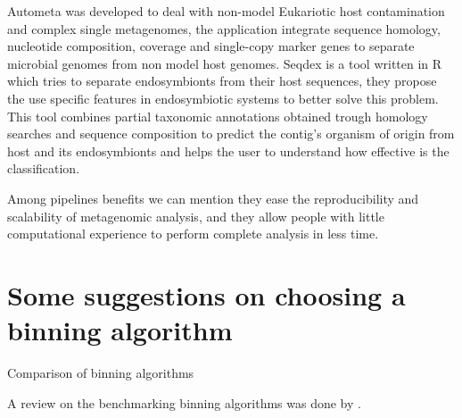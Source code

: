 \documentclass{article}
\begin{document}
Autometa was developed to deal with non-model Eukariotic host contamination and complex single metagenomes, the application integrate sequence homology, nucleotide composition, coverage and single-copy marker genes to separate microbial genomes from non model host genomes. 
Seqdex is a tool written in R which tries to separate endosymbionts from their host sequences, they propose the use specific features in endosymbiotic systems to better solve this problem. This tool combines partial taxonomic annotations obtained trough homology searches and sequence composition to predict the contig's organism of origin from host and its endosymbionts and helps the user to understand how effective is the classification.

Among pipelines benefits we can mention they ease the reproducibility and scalability of metagenomic analysis, and they allow people with little computational experience to perform complete analysis in less time.

\section{Some suggestions on choosing a binning algorithm}
\begin{table}
\begin{tiny}
\centering
\caption[Comparison of binning algorithms]{Comparison of binning algorithms}
	
\label{Tbinningsoftware}
\end{tiny}
\end{table}

A review on the benchmarking binning algorithms was done by .
\end{document}
